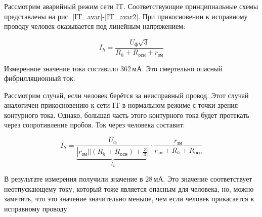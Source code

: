 	Рассмотрим аварийный режим сети IT. Соответствующие принципиальные схемы представлены на рис. \ref{IT_avar}-\ref{IT_avar2}. При прикосновении к исправному проводу человек оказывается под линейным напряжением:
	
	\begin{equation*}
		I_h = \frac{U_\text{ф} \sqrt{3}}{R_h + R_\text{осн} + r_\text{зм}}
	\end{equation*}

	Измеренное значение тока составило 362\,мА. Это смертельно опасный фибрилляционный ток.
	
	Рассмотрим случай, если человек берётся за неисправный провод. Этот случай аналогичен прикосновению к сети IT в нормальном режиме с точки зрения контурного тока. Однако, большая часть этого контурного тока будет протекать через сопротивление пробоя. Ток через человека составит:
	
	\begin{equation*}
		I_h = \underbrace{\frac{U_\text{ф}}{\left|r_\text{зм}||\left(R_h + R_\text{осн}\right) + \frac{Z}{3}\right|}}_{I_\text{к}}\cdot \frac{r_\text{зм}}{r_\text{зм} + R_h + R_\text{осн}}
	\end{equation*}

	В результате измерения получили значение в 28\,мА. Это значение соответствует неотпускающему току, который тоже является опасным для человека, но, можно заметить, что это значение значительно меньше, чем если человек прикасается к исправному проводу.
	
